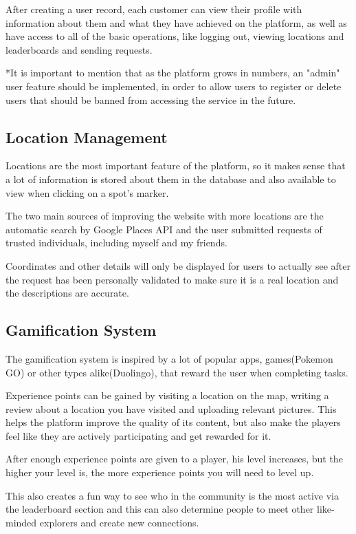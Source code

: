 \documentclass[12pt,a4paper]{report}
\begin{document}
After creating a user record, each customer can view their profile with information about them and what they have achieved on the platform, as well as have access to all of the basic operations, like logging out, viewing locations and leaderboards and sending requests.

*It is important to mention that as the platform grows in numbers, an "admin" user feature should be implemented, in order to allow users to register or delete users that should be banned from accessing the service in the future.

\subsection{Location Management}
Locations are the most important feature of the platform, so it makes sense that a lot of information is stored about them in the database and also available to view when clicking on a spot's marker.

The two main sources of improving the website with more locations are the automatic search by Google Places API and the user submitted requests of trusted individuals, including myself and my friends.

Coordinates and other details will only be displayed for users to actually see after the request has been personally validated to make sure it is a real location and the descriptions are accurate. 

\subsection{Gamification System}
The gamification system is inspired by a lot of popular apps, games(Pokemon GO) or other types alike(Duolingo), that reward the user when completing tasks.

Experience points can be gained by visiting a location on the map, writing a review about a location you have visited and uploading relevant pictures. This helps the platform improve the quality of its content, but also make the players feel like they are actively participating and get rewarded for it.

After enough experience points are given to a player, his level increases, but the higher your level is, the more experience points you will need to level up.

This also creates a fun way to see who in the community is the most active via the leaderboard section and this can also determine people to meet other like-minded explorers and create new connections.
\end{document}
